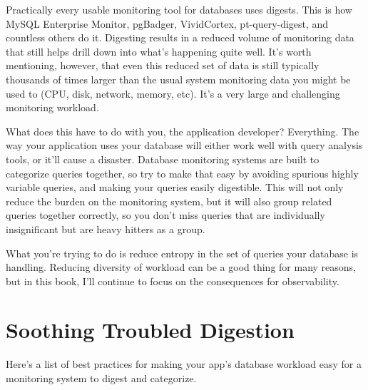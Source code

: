 \documentclass{vivid_layout}
\begin{document}
Practically every usable monitoring tool for databases uses digests. This is how
MySQL Enterprise Monitor, pgBadger, VividCortex, pt-query-digest, and countless
others do it. Digesting results in a reduced volume of monitoring data that still
helps drill down into what's happening quite well. It's worth mentioning,
however, that even this reduced set of data is still typically thousands of
times larger than the usual system monitoring data you might be used to (CPU,
disk, network, memory, etc). It's a very large and challenging monitoring
workload.

What does this have to do with you, the application developer? Everything. The
way your application uses your database will either work well with query
analysis tools, or it'll cause a disaster.  Database monitoring systems
are built to categorize queries together, so try to make that easy by avoiding
spurious highly variable queries, and making your queries easily
digestible. This will not only reduce the burden on the monitoring system, but
it will also group related queries together correctly, so you don't miss queries
that are individually insignificant but are heavy hitters as a group.

What you're trying to do is reduce entropy in the set of queries
your database is handling. Reducing diversity of workload can be a good thing
for many reasons, but in this book, I'll continue to focus on the
consequences for observability.

\section{Soothing Troubled Digestion}

Here's a list of best practices for making your app's
database workload easy for a monitoring system to digest and categorize.
\end{document}
